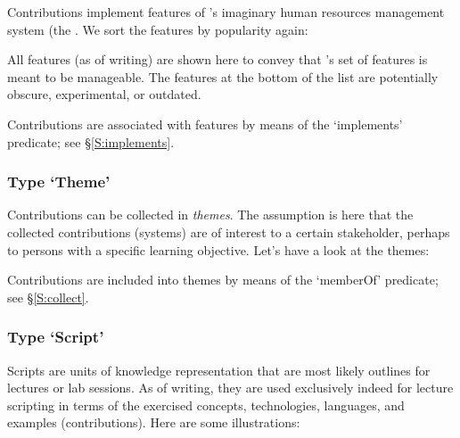 Contributions implement features of \ooo{}'s imaginary human resources
management system (the . We sort the features by
popularity again:


\noindent
All features (as of writing) are shown here to convey that \ooo{}'s
set of features is meant to be manageable. The features at the bottom
of the list are potentially obscure, experimental, or outdated.


\noindent
Contributions are associated with features by means of the
`implements' predicate; see \S\ref{S:implements}.


\subsubsection{Type `Theme'}
\label{S:theme}

Contributions can be collected in \emph{themes}. The assumption is
here that the collected contributions (systems) are of interest to a
certain stakeholder, perhaps to persons with a specific learning
objective. Let's have a look at the themes:



\noindent
Contributions are included into themes by means of the `memberOf'
predicate; see \S\ref{S:collect}.


\subsubsection{Type `Script'}

Scripts are units of knowledge representation that are most likely
outlines for lectures or lab sessions. As of writing, they are used
exclusively indeed for lecture scripting in terms of the exercised
concepts, technologies, languages, and examples (contributions). Here
are some illustrations:




